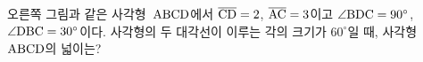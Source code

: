 \noindent\begin{minipage}[t]{0.58\linewidth}\vspace{0pt}\raggedright 오른쪽 그림과 같은 사각형~$\mathrm{ABCD}$에서 $\overline{\mathrm{CD}}=2$, $\overline{\mathrm{AC}}=3$이고 $\angle\mathrm{BDC}=90^\circ$, $\angle\mathrm{DBC}=30^\circ$이다. 사각형의 두 대각선이 이루는 각의 크기가 $60^\circ$일 때, 사각형~$\mathrm{ABCD}$의 넓이는?\end{minipage}\hfill\begin{minipage}[t]{0.4\linewidth}\vspace{0pt}\centering \resizebox{\ifdim\width>\linewidth\linewidth\else\width\fi}{!}{}\end{minipage}\par
{}
